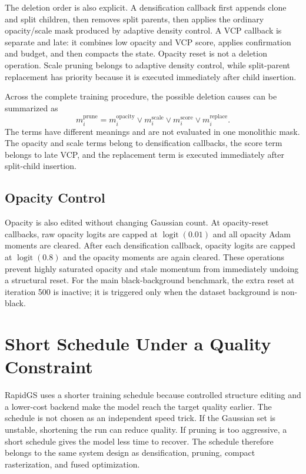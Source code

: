 The deletion order is also explicit. A densification callback first appends clone and split children, then removes split parents, then applies the ordinary opacity/scale mask produced by adaptive density control. A VCP callback is separate and late: it combines low opacity and VCP score, applies confirmation and budget, and then compacts the state. Opacity reset is not a deletion operation. Scale pruning belongs to adaptive density control, while split-parent replacement has priority because it is executed immediately after child insertion.

Across the complete training procedure, the possible deletion causes can be summarized as
\begin{equation}
m_i^{\mathrm{prune}}
=
m_i^{\mathrm{opacity}}
\lor
m_i^{\mathrm{scale}}
\lor
m_i^{\mathrm{score}}
\lor
m_i^{\mathrm{replace}}.
\end{equation}
The terms have different meanings and are not evaluated in one monolithic mask. The opacity and scale terms belong to densification callbacks, the score term belongs to late VCP, and the replacement term is executed immediately after split-child insertion.

\subsection{Opacity Control}

Opacity is also edited without changing Gaussian count. At opacity-reset callbacks, raw opacity logits are capped at $\operatorname{logit}(0.01)$ and all opacity Adam moments are cleared. After each densification callback, opacity logits are capped at $\operatorname{logit}(0.8)$ and the opacity moments are again cleared. These operations prevent highly saturated opacity and stale momentum from immediately undoing a structural reset. For the main black-background benchmark, the extra reset at iteration 500 is inactive; it is triggered only when the dataset background is non-black.

\section{Short Schedule Under a Quality Constraint}

RapidGS uses a shorter training schedule because controlled structure editing and a lower-cost backend make the model reach the target quality earlier. The schedule is not chosen as an independent speed trick. If the Gaussian set is unstable, shortening the run can reduce quality. If pruning is too aggressive, a short schedule gives the model less time to recover. The schedule therefore belongs to the same system design as densification, pruning, compact rasterization, and fused optimization.

